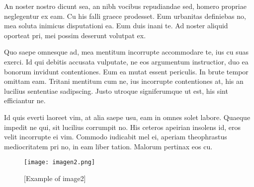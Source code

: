 An noster nostro dicunt sea, an nibh vocibus repudiandae sed, homero propriae neglegentur ex eam. Cu his falli graece prodesset. Eum urbanitas definiebas no, mea soluta inimicus disputationi ea. Eum duis inani te. Ad noster aliquid oporteat pri, mei possim deserunt volutpat ex.

Quo saepe omnesque ad, mea mentitum incorrupte accommodare te, ius cu suas exerci. Id qui debitis accusata vulputate, ne eos argumentum instructior, duo ea bonorum invidunt contentiones. Eum ea mutat essent periculis. In brute tempor omittam eam. Tritani mentitum cum ne, ius incorrupte contentiones at, his an lucilius sententiae sadipscing. Justo utroque signiferumque ut est, his sint efficiantur ne.

Id quis everti laoreet vim, at alia saepe usu, eam in omnes solet labore. Quaeque impedit ne qui, sit lucilius corrumpit no. His ceteros apeirian insolens id, eros velit incorrupte ei vim. Commodo iudicabit mel ei, aperiam theophrastus mediocritatem pri no, in eam liber tation. Malorum pertinax eos cu.

\begin{figure}[h]
\caption{[Example of image2]}
\centering
\texttt{[image: imagen2.png]}
\end{figure}


